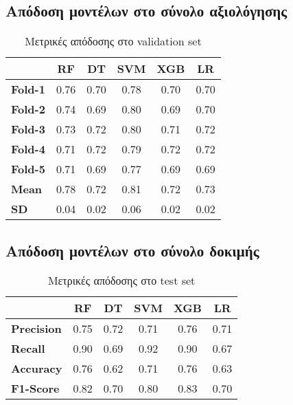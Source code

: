 \documentclass[diploma]{softlab-thesis}
\begin{document}
\begin{enumerate}
\begin{enumerate}
\subsection{Απόδοση μοντέλων στο σύνολο αξιολόγησης}


\begin{table}[H]
\centering
\begin{tabular}{|l|c|c|c|c|c|}
\hline
                & \textbf{RF} & \textbf{DT} & \textbf{SVM} & \textbf{XGB} & \textbf{LR} \\ \hline
\textbf{Fold-1} &    0.76         &     0.70        &    0.78          &    0.70          &    0.70       \\ \hline
\textbf{Fold-2} &     0.74        &       0.69      &     0.80         &       0.69       &     0.70        \\ \hline
\textbf{Fold-3} &     0.73        &      0.72       &        0.80      &    0.71          &     0.72        \\ \hline
\textbf{Fold-4} &     0.71        &     0.72        &      0.79        &     0.72         &    0.72         \\ \hline
\textbf{Fold-5} &     0.71        &         0.69    &      0.77        &        0.69      &      0.69       \\ \hline
\textbf{Mean}   &      0.78       &      0.72       &      0.81        &       0.72       &    0.73         \\ \hline
\textbf{SD}     &     0.04        &     0.02        &     0.06         &        0.02      &      0.02       \\ \hline
\end{tabular}
\caption{Μετρικές απόδοσης στο validation set}
\end{table}

\subsection{Απόδοση μοντέλων στο σύνολο δοκιμής}

\begin{table}[H]
\centering
\begin{tabular}{|l|c|c|c|c|c|}
\hline
       & \textbf{RF} & \textbf{DT} & \textbf{SVM} & \textbf{XGB} & \textbf{LR} \\ \hline
\textbf{Precision} & 0.75        & 0.72        & 0.71         & 0.76         & 0.71        \\ \hline
\textbf{Recall}    & 0.90        & 0.69        & 0.92         & 0.90         & 0.67       \\ \hline
\textbf{Accuracy}  & 0.76        & 0.62        & 0.71         & 0.76         & 0.63        \\ \hline
\textbf{F1-Score}  & 0.82        & 0.70        & 0.80         & 0.83         & 0.70      \\ \hline
\end{tabular}
\caption{Μετρικές απόδοσης στο test set}
\end{table}


\end{enumerate}
\end{enumerate}
\end{document}
